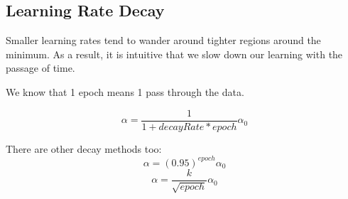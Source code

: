 \subsection{Learning Rate Decay}
Smaller learning rates tend to wander around tighter regions around the minimum. As a result, it is intuitive that we slow down our learning with the passage of time.

We know that 1 epoch means 1 pass through the data. 

$$
\alpha = \frac{1}{1 + decayRate * epoch} \alpha_0
$$

There are other decay methods too: 
$$
\alpha = (0.95)^{epoch} \alpha_0
$$
$$
\alpha = \frac{k}{\sqrt{epoch}}\alpha_0
$$